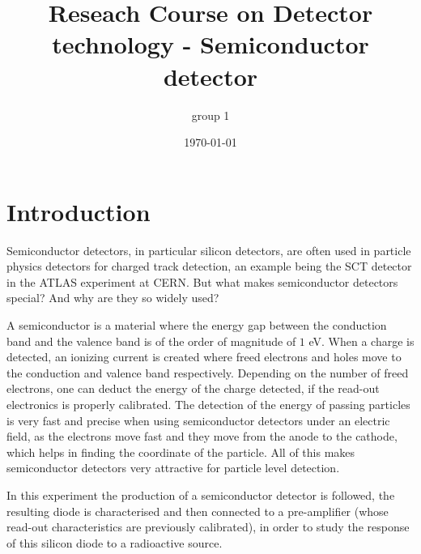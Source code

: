\documentclass[12pt]{article}
\title{Reseach Course on Detector technology - Semiconductor detector}
\author{group 1}
\date{\today}
\begin{document}

\maketitle

\clearpage
  
\tableofcontents
  
  
  
  
\cleardoublepage

%
%

\section{Introduction}

Semiconductor detectors, in particular silicon detectors, are often used in particle physics detectors for charged track detection, an example being the SCT detector in the ATLAS experiment at CERN. But what makes semiconductor detectors special? And why are they so widely used?

A semiconductor is a material where the energy gap between the conduction band and the valence band is of the order of magnitude of $1$ eV. When a charge is detected, an ionizing current is created where freed electrons and holes move to the conduction and valence band respectively. Depending on the number of freed electrons, one can deduct the energy of the charge detected, if the read-out electronics is properly calibrated. The detection of the energy of passing particles is very fast and precise when using semiconductor detectors under an electric field, as the electrons move fast and they move from the anode to the cathode, which helps in finding the coordinate of the particle. All of this makes semiconductor detectors very attractive for particle level detection.

In this experiment the production of a semiconductor detector is followed, the resulting diode is characterised and then connected to a pre-amplifier (whose read-out characteristics are previously calibrated), in order to study the response of this silicon diode to a radioactive source.
\end{document}
